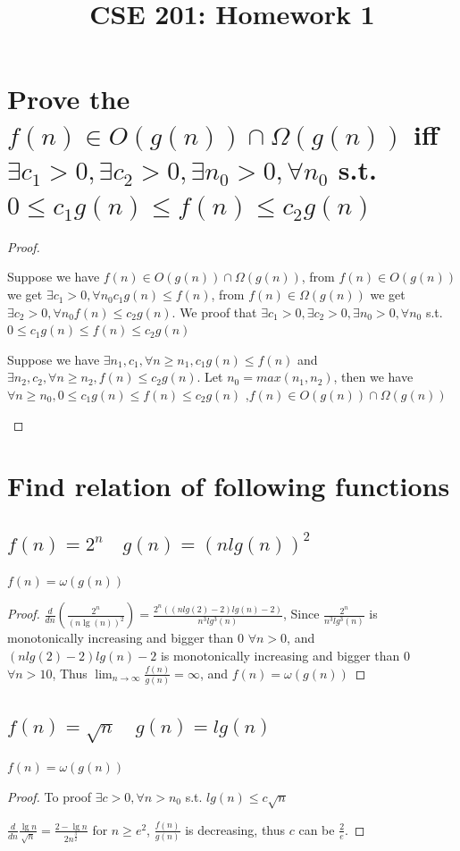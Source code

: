 \documentclass[a4paper]{article}
\title{CSE 201: Homework 1}
\begin{document}
\maketitle
\section{Prove the $f(n)\in O(g(n))\cap \Omega(g(n))$ iff $\exists c_1>0,\exists c_2>0,\exists n_0>0, \forall n_0$ s.t. $0\leq c_1 g(n)\leq f(n)\leq c_2g(n)$}     
\begin{proof}
        \begin{enumurate}
                \item Suppose we have $f(n)\in O(g(n))\cap \Omega(g(n))$, from $f(n)\in O(g(n))$ we get $\exists c_1>0, \forall n_0 c_1g(n)\leq f(n)$, from $f(n)\in \Omega(g(n))$ we get $\exists c_2>0, \forall n_0 f(n)\leq c_2g(n)$. We proof that $\exists c_1>0,\exists c_2>0,\exists n_0>0, \forall n_0$ s.t. $0\leq c_1 g(n)\leq f(n)\leq c_2g(n)$
                \item Suppose we have $\exists n_1, c_1, \forall n \geq n_1, c_1 g(n) \leq f(n) $ and $\exists n_2, c_2, \forall n \geq n_2, f(n) \leq c_2 g(n)$. Let $n_0 = max(n_1, n_2)$, then we have $\forall n\geq n_0, 0\leq c_1 g(n)\leq f(n)\leq c_2g(n) $ ,$f(n)\in O(g(n))\cap \Omega(g(n))$
        \end{enumurate}
\end{proof}
\section{Find relation of following functions}
\subsection{$f(n)=2^n\quad  g(n)={(n lg(n))^2}$}
$f(n)=\omega(g(n))$
\begin{proof}
        $\frac{d}{d n}\left(\frac{2^n}{(n \lg (n))^2}\right) =\frac{2^n((n lg (2)-2) lg (n)-2)}{n^3 lg ^3(n)}$, Since $\frac {2^n}{n^3 lg ^3(n)}$ is monotonically increasing and bigger than 0 $\forall n > 0$, and $(n lg (2)-2) lg (n)-2$ is monotonically increasing and bigger than 0 $\forall n > 10$, Thus $\lim _{n \rightarrow \infty} \frac{f(n)}{g(n)}=\infty$, and $f(n)=\omega(g(n))$
\end{proof}
\subsection{$f(n)=\sqrt{n} \quad g(n)= lg (n)$}
$f(n)=\omega(g(n))$
\begin{proof}
        To proof $\exists c>0, \forall n>n_0$ s.t. $lg(n)\leq c\sqrt{n}$

        $\frac{d}{d n} \frac{\lg n}{\sqrt{n}}=\frac{2-\lg n}{2 n^{\frac{3} {2}}}$ for $n\geq e^2$, $\frac{f(n)}{g(n)}$ is decreasing, thus $c$ can be $\frac{2}{e}$.
\end{proof}
\end{document}
